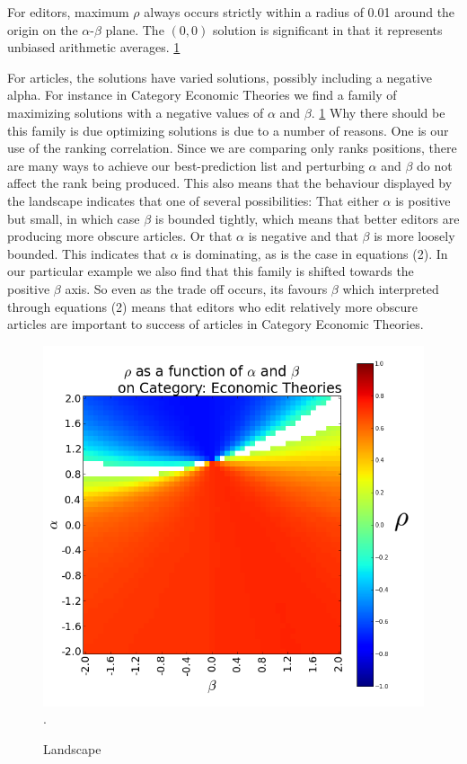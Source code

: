 For editors, maximum $\rho$ always occurs strictly within a radius of 0.01 around the origin on the  $\alpha$-$\beta$ plane. The $(0,0)$ solution is significant in that it represents unbiased arithmetic averages.
\ref{fig:landscape}

For articles, the solutions have varied solutions, possibly including a negative alpha. For instance in Category Economic Theories we find a family of maximizing solutions with a negative values of $\alpha$ and $\beta$. \ref{fig:landscape} Why there should be this family is due optimizing solutions is due to a number of reasons. One is our use of the ranking correlation. Since we are comparing only ranks positions, there are many ways to achieve our best-prediction list and perturbing $\alpha$ and $\beta$ do not affect the rank being produced. This also means that the behaviour displayed by the  landscape indicates that one of several possibilities: That either $\alpha$ is positive but small, in which case $\beta$ is bounded tightly, which means that better editors are producing more obscure articles. Or that $\alpha$ is negative and that $\beta$ is more loosely bounded. This indicates that $\alpha$ is dominating, as is the case in equations (2). In our particular example we also find that this family is shifted towards the positive $\beta$ axis. So even as the trade off occurs, its favours $\beta$ which interpreted through equations (2) means that editors who edit relatively more obscure articles are important to success of articles in Category Economic Theories.

\begin{figure}[!t]
\centering
\includegraphics[width=0.9\columnwidth]{Figures/landscape.png}.
\caption{Landscape}
\label{fig:landscape}
\end{figure}

